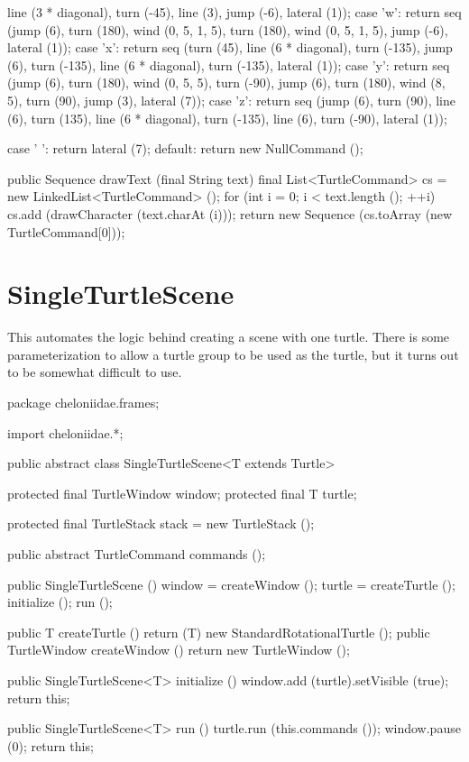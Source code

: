 \documentclass{report}
\begin{document}
\begin{javacode}
{{{                            line (3 * diagonal), turn (-45), line (3), jump (-6), lateral (1));
      case 'w': return seq (jump (6), turn (180), wind (0, 5, 1, 5), turn (180), wind (0, 5, 1, 5), jump (-6),
                            lateral (1));
      case 'x': return seq (turn (45), line (6 * diagonal), turn (-135), jump (6), turn (-135), line (6 * diagonal),
                            turn (-135), lateral (1));
      case 'y': return seq (jump (6), turn (180), wind (0, 5, 5), turn (-90), jump (6), turn (180), wind (8, 5),
                            turn (90), jump (3), lateral (7));
      case 'z': return seq (jump (6), turn (90), line (6), turn (135), line (6 * diagonal), turn (-135), line (6),
                            turn (-90), lateral (1));

      case ' ': return lateral (7);
      default:  return new NullCommand ();
    }
  }

  public Sequence drawText (final String text) {
    final List<TurtleCommand> cs = new LinkedList<TurtleCommand> ();
    for (int i = 0; i < text.length (); ++i) cs.add (drawCharacter (text.charAt (i)));
    return new Sequence (cs.toArray (new TurtleCommand[0]));
  }
}
\end{javacode}

\section {SingleTurtleScene} \label{sec:singleturtlescene}
      This automates the logic behind creating a scene with one turtle. There is some parameterization to allow a turtle group to be used as the turtle, but it
      turns out to be somewhat difficult to use.

\begin{javacode}
package cheloniidae.frames;

import cheloniidae.*;

public abstract class SingleTurtleScene<T extends Turtle> {
  protected final TurtleWindow window;
  protected final T            turtle;

  protected final TurtleStack  stack = new TurtleStack ();

  public abstract TurtleCommand commands ();

  public SingleTurtleScene () {
    window = createWindow ();
    turtle = createTurtle ();
    initialize ();
    run ();
  }

  public T            createTurtle () {return (T) new StandardRotationalTurtle ();}
  public TurtleWindow createWindow () {return new TurtleWindow ();}

  public SingleTurtleScene<T> initialize () {
    window.add (turtle).setVisible (true);
    return this;
  }

  public SingleTurtleScene<T> run () {
    turtle.run (this.commands ());
    window.pause (0);
    return this;
  }
} 
\end{javacode}
\end{document}
